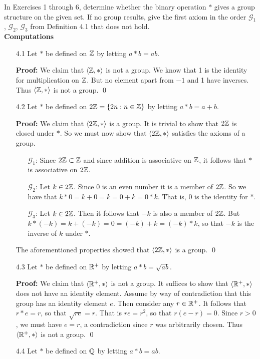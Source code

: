 \noindent In Exercises 1 through 6, determine whether the binary operation $*$
          gives a group structure on the given set. If no group results, give
          the first axiom in the order $\mathscr{G}_1$, $\mathscr{G}_2$,
          $\mathscr{G}_3$ from Definition 4.1 that does not hold. \\

\noindent \textbf{Computations}
\begin{enumerate}
   \item[4.1] Let $*$ be defined on $\mathbb{Z}$ by letting $a * b = ab$.
	
		\textbf{Proof:} We claim that $\langle \mathbb{Z}, * \rangle$ is not a group. We know that 
      1 is the identity for multiplication on $\mathbb{Z}$. But no element apart from 
      $-1$ and 1 have inverses. Thus $\langle \mathbb{Z}, * \rangle$ is not a group. \qed
   \item[4.2] Let $*$ be defined on $2\mathbb{Z} = \{2n : n \in \mathbb{Z}\}$ by letting
              $a * b = a + b$.
	
		\textbf{Proof:} We claim that $\langle 2\mathbb{Z}, * \rangle$ is a group. It is trivial to
      show that $2\mathbb{Z}$ is closed under $*$. So we must now show that
      $\langle 2\mathbb{Z}, * \rangle$ satisfies the axioms of a group. 
		\begin{enumerate}
			\item[$\mathscr{G}_1$:] Since $2\mathbb{Z} \subset \mathbb{Z}$ and since addition is
											associative on $\mathbb{Z}$, it follows that $*$ is
											associative on $2\mathbb{Z}$.
			\item[$\mathscr{G}_2$:] Let $k \in 2\mathbb{Z}$. Since 0 is an even number it
											is a member of $2\mathbb{Z}$. So we have that
											$k * 0 = k + 0 = k = 0 + k = 0 * k$. That is, 0
											is the identity for $*$.
			\item[$\mathscr{G}_3$:] Let $k \in 2\mathbb{Z}$. Then it follows that $-k$ is
											also a member of $2\mathbb{Z}$. But
											$k * (-k) = k + (-k) = 0 = (-k)+ k = (-k) * k$,
											so that $-k$ is the inverse of $k$ under $*$.
		\end{enumerate}
		
		The aforementioned properties showed that $\langle 2\mathbb{Z}, * \rangle$ is a group. \qed
   \item[4.3] Let $*$ be defined on $\mathbb{R}^+$ by letting $a * b = \sqrt{ab}$.

      \textbf{Proof:} We claim that $\langle \mathbb{R}^+, * \rangle$ is not a group. It suffices 
      to show that $\langle \mathbb{R}^+, * \rangle$ does not have an identity element. Assume by 
      way of contradiction that this group has an identity element $e$. Then 
      consider any $r \in \mathbb{R}^+$. It follows that $r * e = r$, so that
      $\sqrt{re} = r$. That is $re = r^2$, so that $r(e - r) = 0$. Since
      $r > 0$, we must have $e = r$, a contradiction since $r$ was arbitrarily
      chosen. Thus $\langle \mathbb{R}^+, * \rangle$ is not a group. \qed
   \item[4.4] Let $*$ be defined on $\mathbb{Q}$ by letting $a * b = ab$.
	

\end{enumerate}
